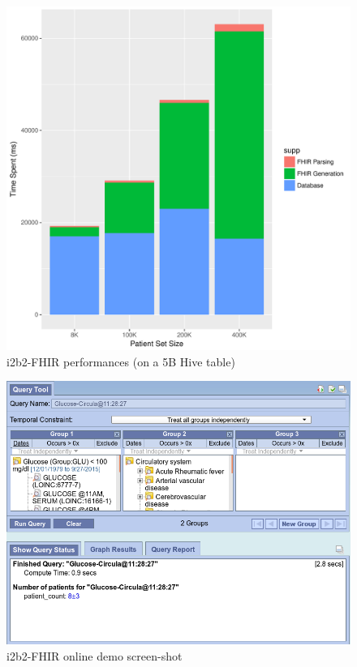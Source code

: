 \documentclass{amia}
\begin{document}
\begin{figure}[h]
\centering
\includegraphics[scale=.7]{graph1.pdf}
	\caption{i2b2-FHIR performances (on a 5B Hive table)}
\label{fig2}
\end{figure}
\begin{figure}[h]
\centering
\includegraphics[scale=.5]{demo.png}
	\caption{i2b2-FHIR online demo screen-shot}
\label{fig3}
\end{figure}
\end{document}

